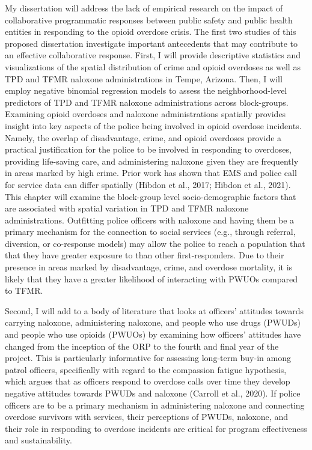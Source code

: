 My dissertation will address the lack of empirical research on the impact of collaborative programmatic responses between public safety and public health entities in responding to the opioid overdose crisis. The first two studies of this proposed dissertation investigate important antecedents that may contribute to an effective collaborative response. First, I will provide descriptive statistics and visualizations of the spatial distribution of crime and opioid overdoses as well as TPD and TFMR naloxone administrations in Tempe, Arizona. Then, I will employ negative binomial regression models to assess the neighborhood-level predictors of TPD and TFMR naloxone administrations across block-groups. Examining opioid overdoses and naloxone administrations spatially provides insight into key aspects of the police being involved in opioid overdose incidents. Namely, the overlap of disadvantage, crime, and opioid overdoses provide a practical justification for the police to be involved in responding to overdoses, providing life-saving care, and administering naloxone given they are frequently in areas marked by high crime. Prior work has shown that EMS and police call for service data can differ spatially (Hibdon et al., 2017; Hibdon et al., 2021). This chapter will examine the block-group level socio-demographic factors that are associated with spatial variation in TPD and TFMR naloxone administrations. Outfitting police officers with naloxone and having them be a primary mechanism for the connection to social services (e.g., through referral, diversion, or co-response models) may allow the police to reach a population that that they have greater exposure to than other first-responders. Due to their presence in areas marked by disadvantage, crime, and overdose mortality, it is likely that they have a greater likelihood of interacting with PWUOs compared to TFMR. 

Second, I will add to a body of literature that looks at officers’ attitudes towards carrying naloxone, administering naloxone, and people who use drugs (PWUDs) and people who use opioids (PWUOs) by examining how officers’ attitudes have changed from the inception of the ORP to the fourth and final year of the project. This is particularly informative for assessing long-term buy-in among patrol officers, specifically with regard to the compassion fatigue hypothesis, which argues that as officers respond to overdose calls over time they develop negative attitudes towards PWUDs and naloxone (Carroll et al., 2020). If police officers are to be a primary mechanism in administering naloxone and connecting overdose survivors with services, their perceptions of PWUDs, naloxone, and their role in responding to overdose incidents are critical for program effectiveness and sustainability. 

